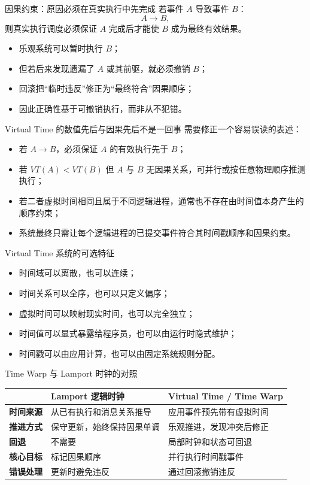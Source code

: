 \documentclass[UTF8,fontset=none,aspectratio=169,10pt]{beamer}
\begin{document}
\begin{frame}{因果约束：原因必须在真实执行中先完成}
若事件 $A$ 导致事件 $B$：
\[
A\rightarrow B,
\]
则真实执行调度必须保证 $A$ 完成后才能使 $B$ 成为最终有效结果。
\vfill
\begin{itemize}
  \item 乐观系统可以暂时执行 $B$；
  \item 但若后来发现遗漏了 $A$ 或其前驱，就必须撤销 $B$；
  \item 回滚把“临时违反”修正为“最终符合”因果顺序；
  \item 因此正确性基于可撤销执行，而非从不犯错。
\end{itemize}
\end{frame}

\begin{frame}{Virtual Time 的数值先后与因果先后不是一回事}
需要修正一个容易误读的表述：
\begin{itemize}
  \item 若 $A\rightarrow B$，必须保证 $A$ 的有效执行先于 $B$；
  \item 若 $VT(A)<VT(B)$ 但 $A$ 与 $B$ 无因果关系，可并行或按任意物理顺序推测执行；
  \item 若二者虚拟时间相同且属于不同逻辑进程，通常也不存在由时间值本身产生的顺序约束；
  \item 系统最终只需让每个逻辑进程的已提交事件符合其时间戳顺序和因果约束。
\end{itemize}
\vfill
{}
\end{frame}

\begin{frame}{Virtual Time 系统的可选特征}
\begin{itemize}
  \item 时间域可以离散，也可以连续；
  \item 时间关系可以全序，也可以只定义偏序；
  \item 虚拟时间可以映射现实时间，也可以完全独立；
  \item 时间值可以显式暴露给程序员，也可以由运行时隐式维护；
  \item 时间戳可以由应用计算，也可以由固定系统规则分配。
\end{itemize}
\end{frame}

\begin{frame}{Time Warp 与 Lamport 时钟的对照}
\begin{tabularx}{\linewidth}{>{\bfseries}p{2.6cm}XX}
\toprule
 & Lamport 逻辑时钟 & Virtual Time / Time Warp \\
\midrule
时间来源 & 从已有执行和消息关系推导 & 应用事件预先带有虚拟时间 \\
推进方式 & 保守更新，始终保持因果单调 & 乐观推进，发现冲突后修正 \\
回退 & 不需要 & 局部时钟和状态可回退 \\
核心目标 & 标记因果顺序 & 并行执行时间戳事件 \\
错误处理 & 更新时避免违反 & 通过回滚撤销违反 \\
\bottomrule
\end{tabularx}
\end{frame}
\end{document}
